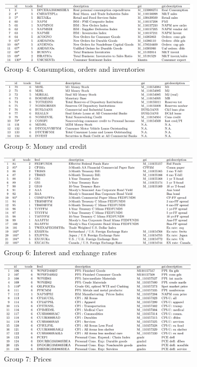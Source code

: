 \begin{figure}
        \centering
        \caption*{Group 4: Consumption, orders and inventories}
        \includegraphics[width=0.9\textwidth]{figures/G4.png}
\end{figure}

\begin{figure}
        \centering
        \caption*{Group 5: Money and credit}
        \includegraphics[width=0.9\textwidth]{figures/G5.png}
\end{figure}

\begin{figure}
        \centering
        \caption*{Group 6: Interest and exchange rates}
        \includegraphics[width=0.9\textwidth]{figures/G6.png}
\end{figure}

\begin{figure}
        \centering
        \caption*{Group 7: Prices}
        \includegraphics[width=0.9\textwidth]{figures/G7.png}
\end{figure}

